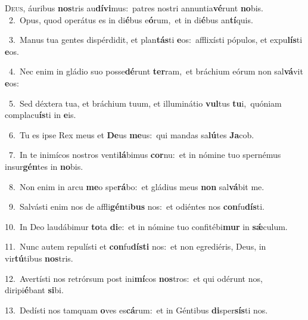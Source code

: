 \lettrine{\initial\textcolor{\initialcolor}{D}}{eus,} áuribus \textbf{nos}\-tris au\-\textbf{dí}\-\textbf{vi}mus:~\star patres nostri annuntia\-\textbf{vé}\-runt \textbf{no}\-bis.\\
{\numbfont\textcolor{\numbcolor}{~2.}}~Opus, quod operátus es in di\-\textbf{é}\-bus e\-\textbf{ó}\-rum,~\star et in di\-\textbf{é}\-bus an\-\textbf{tí}\-quis.\par
{\numbfont\textcolor{\numbcolor}{~3.}}~Manus tua gentes dispérdidit, et plan\-\textbf{tás}\-ti \textbf{e}\-os:~\star afflixísti pópulos, et expu\-\textbf{lís}\-ti \textbf{e}\-os.\par
{\numbfont\textcolor{\numbcolor}{~4.}}~Nec enim in gládio suo posse\-\textbf{dé}\-runt \textbf{ter}\-ram,~\star et bráchium eórum non sal\-\textbf{vá}\-vit \textbf{e}\-os:\par
{\numbfont\textcolor{\numbcolor}{~5.}}~Sed déxtera tua, et bráchium tuum, et illuminátio \textbf{vul}\-tus \textbf{tu}\-i,~\star quóniam complacu\-\textbf{ís}\-ti in \textbf{e}\-is.\par
{\numbfont\textcolor{\numbcolor}{~6.}}~Tu es ipse Rex meus et \textbf{De}\-us \textbf{me}\-us:~\star qui mandas sa\-\textbf{lú}\-tes \textbf{Ja}\-cob.\par
{\numbfont\textcolor{\numbcolor}{~7.}}~In te inimícos nostros venti\-\textbf{lá}\-bimus \textbf{cor}\-nu:~\star et in nómine tuo spernémus insur\-\textbf{gén}\-tes in \textbf{no}\-bis.\par
{\numbfont\textcolor{\numbcolor}{~8.}}~Non enim in arcu \textbf{me}\-o spe\-\textbf{rá}\-bo:~\star et gládius meus \textbf{non} sal\-\textbf{vá}\-bit me.\par
{\numbfont\textcolor{\numbcolor}{~9.}}~Salvásti enim nos de affli\-\textbf{gén}\-ti\textbf{bus} nos:~\star et odiéntes nos \textbf{con}\-fu\-\textbf{dís}\-ti.\par
{\numbfont\textcolor{\numbcolor}{10.}}~In Deo laudábimur \textbf{to}\-ta \textbf{di}\-e:~\star et in nómine tuo confitébi\textbf{mur} in \textbf{sǽ}\-culum.\par
{\numbfont\textcolor{\numbcolor}{11.}}~Nunc autem repulísti et \textbf{con}\-fu\-\textbf{dís}\-\textbf{ti} nos:~\star et non egrediéris, Deus, in vir\-\textbf{tú}\-tibus \textbf{nos}\-tris.\par
{\numbfont\textcolor{\numbcolor}{12.}}~Avertísti nos retrórsum post ini\-\textbf{mí}\-cos \textbf{nos}\-tros:~\star et qui odérunt nos, diripi\-\textbf{é}\-bant \textbf{si}\-bi.\par
{\numbfont\textcolor{\numbcolor}{13.}}~Dedísti nos tamquam \textbf{o}\-ves es\-\textbf{cá}\-rum:~\star et in Géntibus \textbf{di}\-sper\-\textbf{sís}\-ti nos.\par
